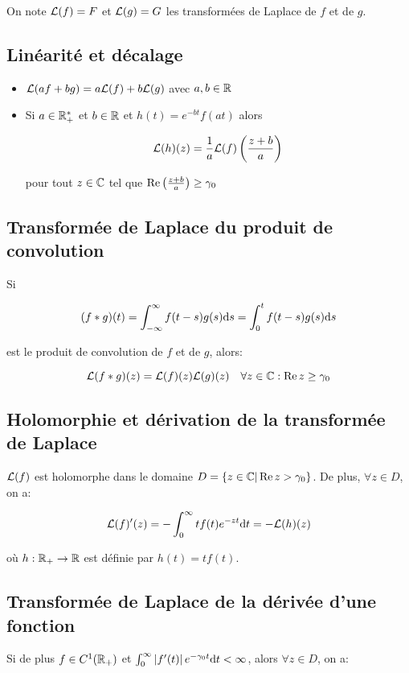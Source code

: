 On note $\mathcal{L}(f) = F$ et $\mathcal{L}(g) = G$ les transformées de Laplace de $f$ et de $g$.

\subsection{Linéarité et décalage}

\begin{itemize}
    \item 
    $\mathcal{L}(af + bg) = a \mathcal{L}(f) + b \mathcal{L}(g)$ avec $a, b \in \mathbb{R}$
    \item 
    Si $a \in \mathbb{R}_+^\ast$ et $b \in \mathbb{R}$ et $h(t) = e^{-bt} f(at)$ alors
    
    \[ \mathcal{L}(h)(z) = \frac{1}{a} \mathcal{L}(f)\left(\frac{z + b}{a}\right) \]
    
    pour tout $z \in \mathbb{C}$ tel que $\operatorname{Re}\left(\frac{z + b}{a}\right) \geq \gamma_0$
\end{itemize}

\subsection{Transformée de Laplace du produit de convolution}

Si

    \[
        (f \ast g)(t)
        = \int_{-\infty}^\infty f(t - s)g(s) \mathrm{d}s
        = \int_0^t f(t-s)g(s) \mathrm{d}s
    \]

est le produit de convolution de $f$ et de $g$, alors:

\[
    \mathcal{L}(f \ast g)(z) = \mathcal{L}(f)(z)\mathcal{L}(g)(z) \quad \forall z \in \mathbb{C} : \operatorname{Re} z \geq \gamma_0
\]

\subsection{Holomorphie et dérivation de la transformée de Laplace}

$\mathcal{L}(f)$ est holomorphe dans le domaine $D = \{ z \in \mathbb{C} | \operatorname{Re} z > \gamma_0 \}$.
De plus, $\forall z \in D$, on a:

\[ \mathcal{L}(f)'(z) = - \int_0^\infty t f(t) e^{-zt} \mathrm{d}t = - \mathcal{L}(h)(z) \]

où $h: \mathbb{R}_+ \rightarrow \mathbb{R}$ est définie par $h(t) = tf(t)$.

\subsection{Transformée de Laplace de la dérivée d'une fonction}

Si de plus $f \in C^1(\mathbb{R}_+)$ et $\int_0^\infty \left|f'(t)\right| e^{-\gamma_0 t} \mathrm{d}t < \infty$, alors $\forall z \in D$, on a:

